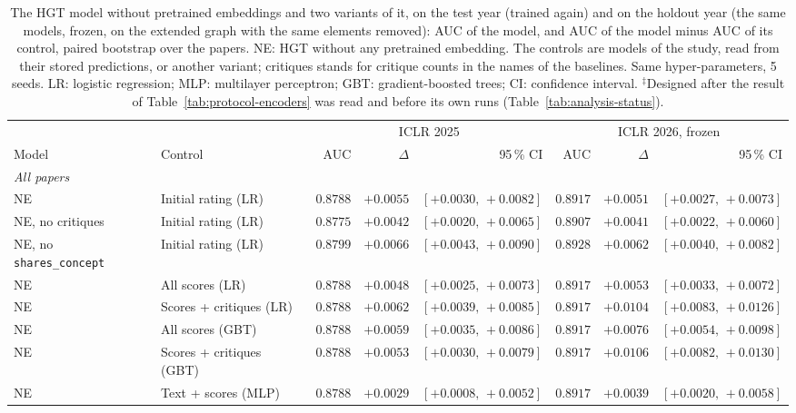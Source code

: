\begin{table}[t]
\centering
\footnotesize
\setlength{\tabcolsep}{1.5pt}
\caption{The HGT model without pretrained embeddings and two variants of it, on the test year (trained again) and on the holdout year (the same models, frozen, on the extended graph with the same elements removed): AUC of the model, and AUC of the model minus AUC of its control, paired bootstrap over the papers. NE: HGT without any pretrained embedding. The controls are models of the study, read from their stored predictions, or another variant; critiques stands for critique counts in the names of the baselines. Same hyper-parameters, 5 seeds. LR: logistic regression; MLP: multilayer perceptron; GBT: gradient-boosted trees; CI: confidence interval. $^{\ddagger}$Designed after the result of Table~\ref{tab:protocol-encoders} was read and before its own runs (Table~\ref{tab:analysis-status}).}
\label{tab:followup}
\begin{tabular}{@{}llrrrrrr@{}}
\toprule
 & & \multicolumn{3}{c}{ICLR 2025} & \multicolumn{3}{c}{ICLR 2026, frozen} \\
\cmidrule(lr){3-5} \cmidrule(lr){6-8}
Model & Control & AUC & $\Delta$ & 95\,\% CI & AUC & $\Delta$ & 95\,\% CI \\
\midrule
\multicolumn{8}{l}{\emph{All papers}} \\
NE & Initial rating (LR) & $0.8788$ & $+0.0055$ & $[+0.0030,\,+0.0082]$ & $0.8917$ & $+0.0051$ & $[+0.0027,\,+0.0073]$ \\
NE, no critiques & Initial rating (LR) & $0.8775$ & $+0.0042$ & $[+0.0020,\,+0.0065]$ & $0.8907$ & $+0.0041$ & $[+0.0022,\,+0.0060]$ \\
NE, no \texttt{shares\_concept} & Initial rating (LR) & $0.8799$ & $+0.0066$ & $[+0.0043,\,+0.0090]$ & $0.8928$ & $+0.0062$ & $[+0.0040,\,+0.0082]$ \\
NE & All scores (LR) & $0.8788$ & $+0.0048$ & $[+0.0025,\,+0.0073]$ & $0.8917$ & $+0.0053$ & $[+0.0033,\,+0.0072]$ \\
NE & Scores + critiques (LR) & $0.8788$ & $+0.0062$ & $[+0.0039,\,+0.0085]$ & $0.8917$ & $+0.0104$ & $[+0.0083,\,+0.0126]$ \\
NE & All scores (GBT) & $0.8788$ & $+0.0059$ & $[+0.0035,\,+0.0086]$ & $0.8917$ & $+0.0076$ & $[+0.0054,\,+0.0098]$ \\
NE & Scores + critiques (GBT) & $0.8788$ & $+0.0053$ & $[+0.0030,\,+0.0079]$ & $0.8917$ & $+0.0106$ & $[+0.0082,\,+0.0130]$ \\
NE & Text + scores (MLP) & $0.8788$ & $+0.0029$ & $[+0.0008,\,+0.0052]$ & $0.8917$ & $+0.0039$ & $[+0.0020,\,+0.0058]$ \\

\end{tabular}
\end{table}
